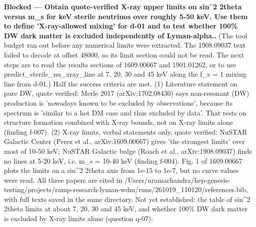 \documentclass[11pt,a4paper]{article}
\begin{document}
\textbf{Blocked --- Obtain quote-verified X-ray upper limits on sin\textasciicircum{}2 2theta versus m\_s for keV sterile neutrinos over roughly 5-50 keV. Use them to define 'X-ray-allowed mixing' for d-01 and to test whether 100\% DW dark matter is excluded independently of Lyman-alpha..} (The tool budget ran out before any numerical limits were extracted. The 1908.09037 text failed to decode at offset 48000, so its limit section could not be read. The next steps are to read the results sections of 1609.00667 and 1901.01262, or to use predict\_sterile\_nu\_xray\_line at 7, 20, 30 and 45 keV along the f\_s = 1 mixing line from d-01.) Half the success criteria are met. (1) Literature statement on pure DW, quote verified: Merle 2017 (arXiv:1702.08430) says non-resonant (DW) production is 'nowadays known to be excluded by observations', because its spectrum is 'similar to a hot DM case and thus excluded by data'. That rests on structure formation combined with X-ray bounds, not on X-ray limits alone (finding f-007). (2) X-ray limits, verbal statements only, quote verified: NuSTAR Galactic Center (Perez et al., arXiv:1609.00667) gives 'the strongest limits' over most of 10-50 keV; NuSTAR Galactic bulge (Roach et al., arXiv:1908.09037) finds no lines at 5-20 keV, i.e. m\_s = 10-40 keV (finding f-004). Fig. 1 of 1609.00667 plots the limits on a sin\textasciicircum{}2 2theta axis from 1e-15 to 1e-7, but no curve values were read. All three papers are cited in /Users/nramachandra/hep-genesis-testing/projects/ramp-research-lyman-wdm/runs/261019\_110120/references.bib, with full texts saved in the same directory. Not yet established: the table of sin\textasciicircum{}2 2theta limits at about 7, 20, 30 and 45 keV, and whether 100\% DW dark matter is excluded by X-ray limits alone (question q-07).
\end{document}
